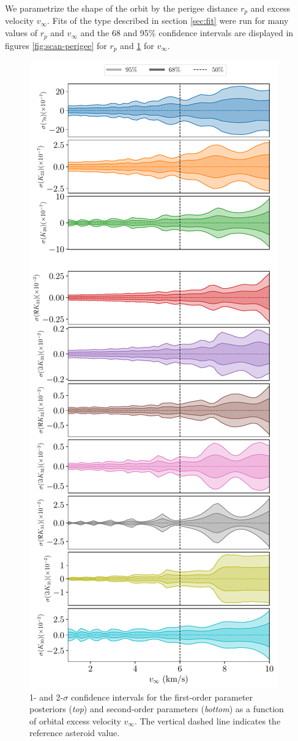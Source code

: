 \documentclass[fleqn,usenatbib]{mnras}
\begin{document}
We parametrize the shape of the orbit by the perigee distance $r_p$ and excess velocity $v_\infty$. Fits of the type described in section \ref{sec:fit} were run for many values of $r_p$ and $v_\infty$ and the 68 and 95\% confidence intervals are displayed in figures \ref{fig:scan-perigee} for $r_p$ and \ref{fig:scan-vex} for $v_\infty$.



\begin{figure}
  \centering
  \includegraphics[height=0.89\textheight]{figs/scan-vex.pdf}
  \caption{1- and 2-$\sigma$ confidence intervals for the first-order parameter posteriors (\textit{top}) and second-order parameters (\textit{bottom}) as a function of orbital excess velocity $v_\infty$. The vertical dashed line indicates the reference asteroid value.}
  \label{fig:scan-vex}
\end{figure}
\end{document}
